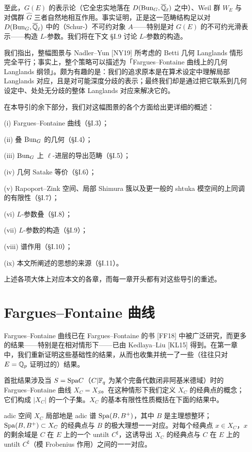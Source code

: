 至此，$G(E)$ 的表示论（它全忠实地落在 $D(\mathrm{Bun}_G,\overline{\mathbb{Q}}_\ell)$ 之中）、Weil 群 $W_E$ 与对偶群 $\widehat{G}$ 三者自然地相互作用。事实证明，正是这一范畴结构足以对 $D(\mathrm{Bun}_G,\overline{\mathbb{Q}}_\ell)$ 中的（Schur-）不可约对象 $A$——特别是对 $G(E)$ 的不可约光滑表示——构造 $L$-参数。我们将在下文 §I.9 讨论 $L$-参数的构造。

我们指出，整幅图景与 Nadler–Yun [NY19] 所考虑的 Betti 几何 Langlands 情形完全平行；事实上，整个策略可以描述为「Fargues–Fontaine 曲线上的几何 Langlands 纲领」。颇为有趣的是：我们的追求原本是在算术设定中理解局部 Langlands 对应，且是对可能深度分歧的表示；最终我们却是通过把它联系到几何设定中、处处无分歧的整体 Langlands 对应来解决它的。

在本导引的余下部分，我们对这幅图景的各个方面给出更详细的概述：

\noindent (i) Fargues–Fontaine 曲线（§I.3）；

\noindent (ii) 叠 $\mathrm{Bun}_G$ 的几何（§I.4）；

\noindent (iii) $\mathrm{Bun}_G$ 上 $\ell$-进层的导出范畴（§I.5）；

\noindent (iv) 几何 Satake 等价（§I.6）；

\noindent (v) Rapoport–Zink 空间、局部 Shimura 簇以及更一般的 shtuka 模空间的上同调的有限性（§I.7）；

\noindent (vi) $L$-参数叠（§I.8）；

\noindent (vii) $L$-参数的构造（§I.9）；

\noindent{}(viii) 谱作用（§I.10）；

\noindent (ix) 本文所阐述的思想的来源（§I.11）。

上述各项大体上对应本文的各章，而每一章开头都有对这些导引的重述。

\section{Fargues–Fontaine 曲线}%

Fargues–Fontaine 曲线已在 Fargues–Fontaine 的书 [FF18] 中被广泛研究，而更多的结果——特别是在相对情形下——已由 Kedlaya–Liu [KL15] 得到。在第一章中，我们重新证明这些基础性的结果，从而也收集并统一了一些（往往只对 $E=\mathbb{Q}_p$ 证明过的）结果。

首批结果涉及当 $S=\mathrm{Spa} C$（$C|\mathbb{F}_q$ 为某个完备代数闭非阿基米德域）时的 Fargues–Fontaine 曲线 $X_C=X_S$。在这种情形下我们定义 $X_C$ 的经典点的概念；它们构成 $|X_C|$ 的一个子集。$X_C$ 的基本有限性性质概括在下面的结果中。

\begin{theorem}%
adic 空间 $X_C$ 局部地是 adic 谱 $\mathrm{Spa}(B,B^+)$，其中 $B$ 是主理想整环；$\mathrm{Spa}(B,B^+)\subset X_C$ 的经典点与 $B$ 的极大理想一一对应。对每个经典点 $x\in X_C$，$x$ 的剩余域是 $C$ 在 $E$ 上的一个 untilt $C^\sharp$，这诱导出 $X_C$ 的经典点与 $C$ 在 $E$ 上的 untilt $C^\sharp$（模 Frobenius 作用）之间的一一对应。
\end{theorem}

